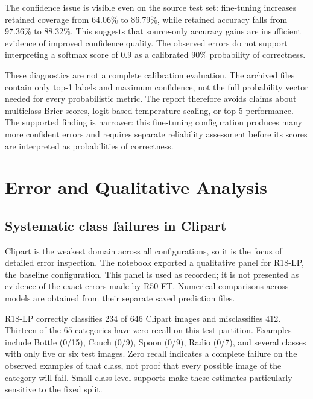 \documentclass[10pt,a4paper]{article}
\begin{document}
The confidence issue is visible even on the source test set: fine-tuning increases retained coverage from 64.06\% to 86.79\%, while retained accuracy falls from 97.36\% to 88.32\%. This suggests that source-only accuracy gains are insufficient evidence of improved confidence quality. The observed errors do not support interpreting a softmax score of 0.9 as a calibrated 90\% probability of correctness.

These diagnostics are not a complete calibration evaluation. The archived files contain only top-1 labels and maximum confidence, not the full probability vector needed for every probabilistic metric. The report therefore avoids claims about multiclass Brier scores, logit-based temperature scaling, or top-5 performance. The supported finding is narrower: this fine-tuning configuration produces many more confident errors and requires separate reliability assessment before its scores are interpreted as probabilities of correctness.


\section{Error and Qualitative Analysis}
\subsection{Systematic class failures in Clipart}
Clipart is the weakest domain across all configurations, so it is the focus of detailed error inspection. The notebook exported a qualitative panel for R18-LP, the baseline configuration. This panel is used as recorded; it is not presented as evidence of the exact errors made by R50-FT. Numerical comparisons across models are obtained from their separate saved prediction files.

R18-LP correctly classifies 234 of 646 Clipart images and misclassifies 412. Thirteen of the 65 categories have zero recall on this test partition. Examples include Bottle (0/15), Couch (0/9), Spoon (0/9), Radio (0/7), and several classes with only five or six test images. Zero recall indicates a complete failure on the observed examples of that class, not proof that every possible image of the category will fail. Small class-level supports make these estimates particularly sensitive to the fixed split.
\end{document}
